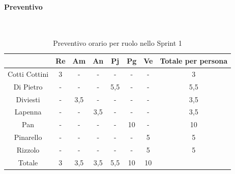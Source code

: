 \documentclass{article}
\begin{document}
                \paragraph{Preventivo}\mbox{}\\
                \begin{table}[H]
                    \centering
                    \begin{tabular}{|c|c|c|c|c|c|c|c|}
                    \hline
                                  & Re  & Am  & An  & Pj  & Pg  & Ve  & Totale per persona \\ \hline
                    Cotti Cottini & 3   & -   & -   & -   & -   & -   & 3                  \\ \hline
                    Di Pietro     & -   & -   & -   & 5,5 & -   & -   & 5,5                \\ \hline
                    Diviesti      & -   & 3,5 & -   & -   & -   & -   & 3,5                \\ \hline
                    Lapenna       & -   & -   & 3,5 & -   & -   & -   & 3,5                \\ \hline
                    Pan           & -   & -   & -   & -   & 10  & -   & 10                 \\ \hline
                    Pinarello     & -   & -   & -   & -   & -   & 5   & 5                  \\ \hline
                    Rizzolo       & -   & -   & -   & -   & -   & 5   & 5                  \\ \hline
                    Totale        & 3   & 3,5 & 3,5 & 5,5 & 10  & 10  &                    \\ \hline
                    \end{tabular}
                    \caption{Preventivo orario per ruolo nello Sprint 1}
                \end{table}

\end{document}
